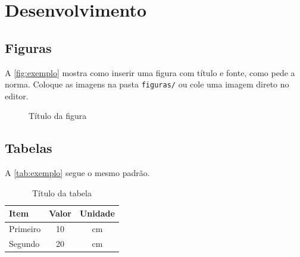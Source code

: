 \chapter{Desenvolvimento}
\label{cap:desenvolvimento}

\section{Figuras}

A \autoref{fig:exemplo} mostra como inserir uma figura com título e fonte, como pede a norma.
Coloque as imagens na pasta \texttt{figuras/} ou cole uma imagem direto no editor.

\begin{figure}[htb]
  \centering
  \caption{Título da figura}
  \label{fig:exemplo}
\end{figure}

\section{Tabelas}

A \autoref{tab:exemplo} segue o mesmo padrão.

\begin{table}[htb]
  \centering
  \ABNTEXfontereduzida
  \caption{Título da tabela}
  \label{tab:exemplo}
  \begin{tabular}{lcc}
    \hline
    Item & Valor & Unidade \\
    \hline
    Primeiro & 10 & cm \\
    Segundo  & 20 & cm \\
    \hline
  \end{tabular}
\end{table}
